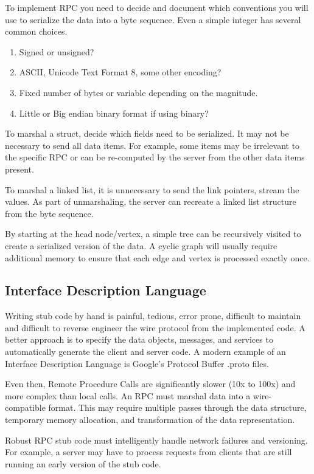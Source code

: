 To implement RPC you need to decide and document which conventions you will use to serialize the data into a byte sequence.
Even a simple integer has several common choices.

\begin{enumerate}
\item Signed or unsigned?
\item ASCII, Unicode Text Format 8, some other encoding?
\item Fixed number of bytes or variable depending on the magnitude.
\item Little or Big endian binary format if using binary?
\end{enumerate}

To marshal a struct, decide which fields need to be serialized.
It may not be necessary to send all data items.
For example, some items may be irrelevant to the specific RPC or can be re-computed by the server from the other data items present.

To marshal a linked list, it is unnecessary to send the link pointers, stream the values.
As part of unmarshaling, the server can recreate a linked list structure from the byte sequence.

By starting at the head node/vertex, a simple tree can be recursively visited to create a serialized version of the data.
A cyclic graph will usually require additional memory to ensure that each edge and vertex is processed exactly once.

\subsection{Interface Description Language}

Writing stub code by hand is painful, tedious, error prone, difficult to maintain and difficult to reverse engineer the wire protocol from the implemented code.
A better approach is to specify the data objects, messages, and services to automatically generate the client and server code.
A modern example of an Interface Description Language is Google's Protocol Buffer .proto files.

Even then, Remote Procedure Calls are significantly slower (10x to 100x) and more complex than local calls.
An RPC must marshal data into a wire-compatible format.
This may require multiple passes through the data structure, temporary memory allocation, and transformation of the data representation.

Robust RPC stub code must intelligently handle network failures and versioning.
For example, a server may have to process requests from clients that are still running an early version of the stub code.

